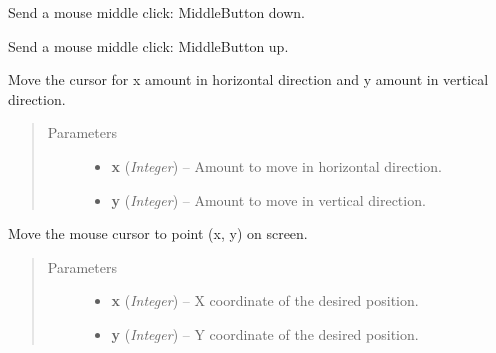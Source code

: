 \documentclass[letterpaper,10pt,english]{sphinxmanual}
\begin{document}

\begin{fulllineitems}
\label{macro:macro.MiddleHold}
Send a mouse middle click: MiddleButton down.

\end{fulllineitems}


\begin{fulllineitems}
\label{macro:macro.MiddleRelease}
Send a mouse middle click: MiddleButton up.

\end{fulllineitems}


\begin{fulllineitems}
\label{macro:macro.Move}
Move the cursor for x amount in horizontal direction and y amount in
vertical direction.
\begin{quote}\begin{description}
\item[{Parameters}] \leavevmode\begin{itemize}
\item {} 
\textbf{x} (\emph{Integer}) -- Amount to move in horizontal direction.

\item {} 
\textbf{y} (\emph{Integer}) -- Amount to move in vertical direction.

\end{itemize}

\end{description}\end{quote}

\end{fulllineitems}


\begin{fulllineitems}
\label{macro:macro.MoveTo}
Move the mouse cursor to point (x, y) on screen.
\begin{quote}\begin{description}
\item[{Parameters}] \leavevmode\begin{itemize}
\item {} 
\textbf{x} (\emph{Integer}) -- X coordinate of the desired position.

\item {} 
\textbf{y} (\emph{Integer}) -- Y coordinate of the desired position.

\end{itemize}

\end{description}\end{quote}

\end{fulllineitems}
\end{document}
